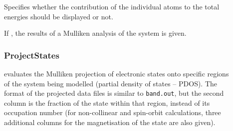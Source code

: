 \begin{description}

\item[] Specifies whether the contribution of the
  individual atoms to the total energies should be displayed or not.

\item[] If , the results of a Mulliken analysis of
  the system is given.

\subsubsection{ProjectStates} 
\label{sec:dftbp.ProjectStates} evaluates the Mulliken
projection of electronic states onto specific regions of the system being
modelled (partial density of states -- PDOS). The format of the projected data
files is similar to \verb|band.out|, but the second column is the fraction of
the state within that region, instead of its occupation number (for
non-collinear and spin-orbit calculations, three additional columns for the
magnetisation of the state are also given).


\end{description}
